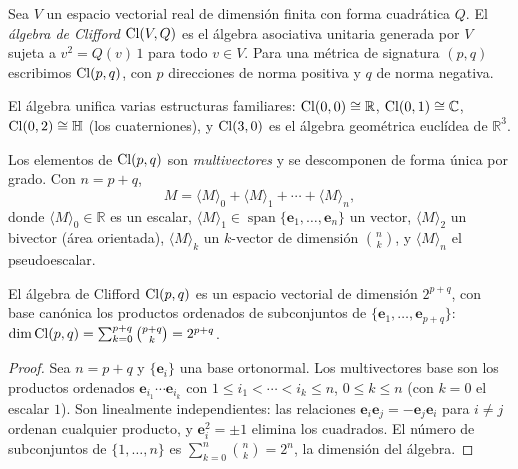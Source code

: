 \begin{definition}
\label{def:gauge:clifford}
Sea $V$ un espacio vectorial real de dimensi\'on finita con forma cuadr\'atica
$Q$. El \emph{\'algebra de Clifford} $\operatorname{Cl}(V, Q)$ es el \'algebra asociativa
unitaria generada por $V$ sujeta a $v^2 = Q(v)\, 1$ para todo $v \in V$. Para una
m\'etrica de signatura $(p, q)$ escribimos $\operatorname{Cl}(p, q)$, con $p$ direcciones de
norma positiva y $q$ de norma negativa.
\end{definition}

El \'algebra unifica varias estructuras familiares: $\operatorname{Cl}(0,0) \cong \mathbb{R}$,
$\operatorname{Cl}(0,1) \cong \mathbb{C}$, $\operatorname{Cl}(0,2) \cong \mathbb{H}$ (los cuaterniones), y
$\operatorname{Cl}(3,0)$ es el \'algebra geom\'etrica eucl\'idea de $\mathbb{R}^3$.

\begin{definition}
\label{def:gauge:multivector}
Los elementos de $\operatorname{Cl}(p, q)$ son \emph{multivectores} y se descomponen de forma
\'unica por grado. Con $n = p + q$,
\[
  M = \langle M \rangle_0 + \langle M \rangle_1 + \cdots + \langle M \rangle_n,
\]
donde $\langle M \rangle_0 \in \mathbb{R}$ es un escalar, $\langle M \rangle_1 \in
\operatorname{span}\{\mathbf{e}_1, \ldots, \mathbf{e}_n\}$ un vector,
$\langle M \rangle_2$ un bivector (\'area orientada), $\langle M \rangle_k$ un
$k$-vector de dimensi\'on $\binom{n}{k}$, y $\langle M \rangle_n$ el
pseudoescalar.
\end{definition}

\begin{theorem}
\label{thm:gauge:clifford-dim}
El \'algebra de Clifford $\operatorname{Cl}(p, q)$ es un espacio vectorial de dimensi\'on
$2^{p+q}$, con base can\'onica los productos ordenados de subconjuntos de
$\{\mathbf{e}_1, \ldots, \mathbf{e}_{p+q}\}$:
$\dim \operatorname{Cl}(p,q) = \sum_{k=0}^{p+q} \binom{p+q}{k} = 2^{p+q}$.
\end{theorem}

\begin{proof}
Sea $n = p+q$ y $\{\mathbf{e}_i\}$ una base ortonormal. Los multivectores base
son los productos ordenados $\mathbf{e}_{i_1}\cdots\mathbf{e}_{i_k}$ con
$1 \le i_1 < \cdots < i_k \le n$, $0 \le k \le n$ (con $k=0$ el escalar $1$).
Son linealmente independientes: las relaciones $\mathbf{e}_i\mathbf{e}_j =
-\mathbf{e}_j\mathbf{e}_i$ para $i \neq j$ ordenan cualquier producto, y
$\mathbf{e}_i^2 = \pm 1$ elimina los cuadrados. El n\'umero de subconjuntos de
$\{1, \ldots, n\}$ es $\sum_{k=0}^{n}\binom{n}{k} = 2^n$, la dimensi\'on del
\'algebra.
\end{proof}

